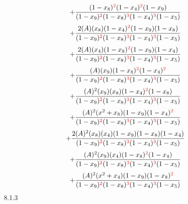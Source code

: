 \documentclass{article}
\begin{document}
\[+\frac{(1-x_8)^{\textcolor{red}{2}}(1-x_4)^{\textcolor{red}{2}}(1-x_9)}{(1-x_9)^{\textcolor{red}{2}}(1-x_8)^{\textcolor{red}{3}}(1-x_4)^{\textcolor{red}{3}}(1-x_5)}\]\[+\frac{2(A)(x_8)(1-x_4)^{\textcolor{red}{2}}(1-x_9)(1-x_8)}{(1-x_9)^{\textcolor{red}{2}}(1-x_8)^{\textcolor{red}{3}}(1-x_4)^{\textcolor{red}{3}}(1-x_5)}\]\[+\frac{2(A)(x_4)(1-x_8)^{\textcolor{red}{2}}(1-x_9)(1-x_4)}{(1-x_9)^{\textcolor{red}{2}}(1-x_8)^{\textcolor{red}{3}}(1-x_4)^{\textcolor{red}{3}}(1-x_5)}\]\[+\frac{(A)(x_9)(1-x_8)^{\textcolor{red}{2}}(1-x_4)^{\textcolor{red}{2}}}{(1-x_9)^{\textcolor{red}{2}}(1-x_8)^{\textcolor{red}{3}}(1-x_4)^{\textcolor{red}{3}}(1-x_5)}\]\[+\frac{(A)^{2}(x_9)(x_8)(1-x_4)^{\textcolor{red}{2}}(1-x_8)}{(1-x_9)^{\textcolor{red}{2}}(1-x_8)^{\textcolor{red}{3}}(1-x_4)^{\textcolor{red}{3}}(1-x_5)}\]\[+\frac{(A)^{2}(x^{2}+x_8)(1-x_9)(1-x_4)^{\textcolor{red}{2}}}{(1-x_9)^{\textcolor{red}{2}}(1-x_8)^{\textcolor{red}{3}}(1-x_4)^{\textcolor{red}{3}}(1-x_5)}\]\[+\frac{2(A)^{2}(x_8)(x_4)(1-x_9)(1-x_8)(1-x_4)}{(1-x_9)^{\textcolor{red}{2}}(1-x_8)^{\textcolor{red}{3}}(1-x_4)^{\textcolor{red}{3}}(1-x_5)}\]\[+\frac{(A)^{2}(x_9)(x_4)(1-x_8)^{\textcolor{red}{2}}(1-x_4)}{(1-x_9)^{\textcolor{red}{2}}(1-x_8)^{\textcolor{red}{3}}(1-x_4)^{\textcolor{red}{3}}(1-x_5)}\]\[+\frac{(A)^{2}(x^{2}+x_4)(1-x_9)(1-x_8)^{\textcolor{red}{2}}}{(1-x_9)^{\textcolor{red}{2}}(1-x_8)^{\textcolor{red}{3}}(1-x_4)^{\textcolor{red}{3}}(1-x_5)}\]
8.1.3
\end{document}
